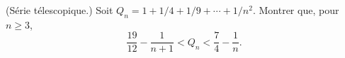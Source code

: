 (Série télescopique.) Soit $Q_n = 1 + 1/4 + 1/9 + \cdots + 1/n^2$. Montrer que, pour $n \geq 3$,
\[ \frac{19}{12} - \frac{1}{n + 1} < Q_n < \frac{7}{4} - \frac{1}{n}. \]
